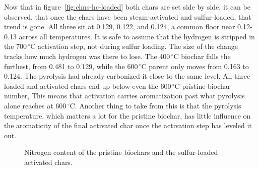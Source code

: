Now that in figure~\ref{fig:chns-hc-loaded} both chars are set side by side, it can be observed, that once the chars have been steam-activated and sulfur-loaded, that trend is gone. All three sit at 0.129, 0.122, and 0.124, a common floor near 0.12-0.13 across all temperatures. It is safe to assume that the hydrogen is stripped in the 700\,$^{\circ}$C activation step, not during sulfur loading. The size of the change tracks how much hydrogen was there to lose. The 400\,$^{\circ}$C biochar falls the furthest, from 0.481 to 0.129, while the 600\,$^{\circ}$C parent only moves from 0.163 to 0.124. The pyrolysis had already carbonized it close to the same level. All three loaded and activated chars end up below even the 600\,$^{\circ}$C pristine biochar number, This means that activation carries aromatization past what pyrolysis alone reaches at 600\,$^{\circ}$C. Another thing to take from this is that the pyrolysis temperature, which matters a lot for the pristine biochar, has little influence on the aromaticity of the final activated char once the activation step has leveled it out.
\clearpage
\begin{figure}[ht]
\centering
{}
\caption{Nitrogen content of the pristine biochars and the sulfur-loaded activated chars.}
\label{fig:chns-nc}
\end{figure}


